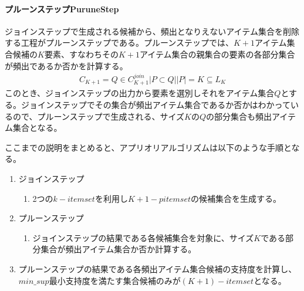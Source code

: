 \documentclass[dvipdfmx]{jsarticle}
\begin{document}
\paragraph{プルーンステップPuruneStep}
ジョインステップで生成される候補から、頻出となりえないアイテム集合を削除する工程がプルーンステップである。プルーンステップでは、$K+1$アイテム集合候補の$K$要素、すなわちその$K+1$アイテム集合の親集合の要素の各部分集合が頻出であるか否かを計算する。
\begin{gather*}
  C_{K+1} = {Q \in C_{K+1}^{join} | {P \subset Q | |P| = K} \subseteq L_{K}}
\end{gather*}
このとき、ジョインステップの出力から要素を選別しそれをアイテム集合$Q$とする。ジョインステップでその集合が頻出アイテム集合であるか否かはわかっているので、プルーンステップで生成される、サイズ$K$の$Q$の部分集合も頻出アイテム集合となる。\par
ここまでの説明をまとめると、アプリオリアルゴリズムは以下のような手順となる。
\begin{enumerate}
  \item ジョインステップ
  \begin{enumerate}
    \item 2つの$k-itemset$を利用し$K+1-pitemset$の候補集合を生成する。
  \end{enumerate}
  \item プルーンステップ
  \begin{enumerate}
    \item ジョインステップの結果である各候補集合を対象に、サイズ$K$である部分集合が頻出アイテム集合か否か計算する。
  \end{enumerate}
  \item プルーンステップの結果である各頻出アイテム集合候補の支持度を計算し、$min\_sup$最小支持度を満たす集合候補のみが$(K+1)-itemset$となる。
\end{enumerate}
\end{document}
